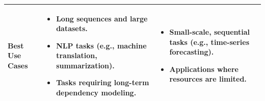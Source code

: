 \begin{longtable}{|>{\raggedright\arraybackslash}p{3.5cm}|>{\raggedright\arraybackslash}p{6cm}|>{\raggedright\arraybackslash}p{6cm}|}
\textbf{Best Use Cases} & 
\begin{itemize}
    \item Long sequences and large datasets.
    \item NLP tasks (e.g., machine translation, summarization).
    \item Tasks requiring long-term dependency modeling.
\end{itemize} & 
\begin{itemize}
    \item Small-scale, sequential tasks (e.g., time-series forecasting).
    \item Applications where resources are limited.
\end{itemize} \\ \hline

\end{longtable}

